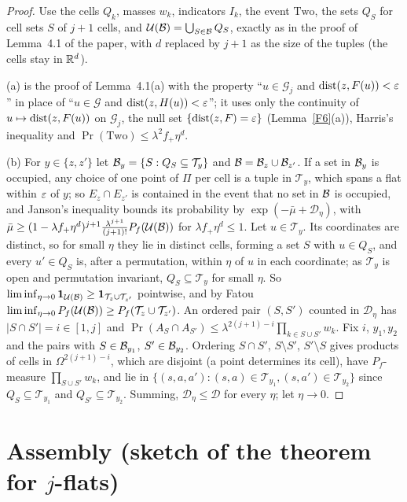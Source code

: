 \documentclass[11pt]{article}
\begin{document}
\begin{proof}
Use the cells $Q_k$, masses $w_k$, indicators $I_k$, the event $\mathrm{Two}$, the sets $Q_S$ for cell sets $S$ of $j+1$
cells, and $\mathcal U(\mathcal{B})=\bigcup_{S\in\mathcal{B}}Q_S$, exactly as in the proof of Lemma~4.1 of the paper, with $d$ replaced by $j+1$ as the
size of the tuples (the cells stay in $\mathbb{R}^d$).

(a) is the proof of Lemma~4.1(a) with the property ``$u\in\mathcal G_j$ and $\operatorname{dist}(z,F(u))<\varepsilon$'' in place of ``$u\in\mathcal G$ and
$\operatorname{dist}(z,H(u))<\varepsilon$''; it uses only the continuity of $u\mapsto\operatorname{dist}(z,F(u))$ on $\mathcal G_j$, the null set
$\{\operatorname{dist}(z,F)=\varepsilon\}$ (Lemma~\ref{F6}(a)), Harris's inequality and $\Pr(\mathrm{Two})\le\lambda^2f_+\eta^d$.

(b) For $y\in\{z,z'\}$ let $\mathcal{B}_y=\{S:Q_S\subseteq\mathcal T_y\}$ and $\mathcal{B}=\mathcal{B}_z\cup\mathcal{B}_{z'}$. If a set in $\mathcal{B}_y$ is occupied, any choice of
one point of $\Pi$ per cell is a tuple in $\mathcal T_y$, which spans a flat within $\varepsilon$ of $y$; so $E_z\cap E_{z'}$ is contained in
the event that no set in $\mathcal{B}$ is occupied, and Janson's inequality bounds its probability by $\exp(-\bar\mu+\mathcal D_\eta)$, with
$\bar\mu\ge(1-\lambda f_+\eta^d)^{j+1}\frac{\lambda^{j+1}}{(j+1)!}P_f(\mathcal U(\mathcal{B}))$ for $\lambda f_+\eta^d\le1$. Let $u\in\mathcal T_y$. Its coordinates are
distinct, so for small $\eta$ they lie in distinct cells, forming a set $S$ with $u\in Q_S$, and every $u'\in Q_S$ is, after a
permutation, within $\eta$ of $u$ in each coordinate; as $\mathcal T_y$ is open and permutation invariant, $Q_S\subseteq\mathcal T_y$ for
small $\eta$. So $\liminf_{\eta\to0}\mathbf{1}_{\mathcal U(\mathcal{B})}\ge\mathbf{1}_{\mathcal T_z\cup\mathcal T_{z'}}$ pointwise, and by Fatou
$\liminf_{\eta\to0}P_f(\mathcal U(\mathcal{B}))\ge P_f(\mathcal T_z\cup\mathcal T_{z'})$. An ordered pair $(S,S')$ counted in $\mathcal D_\eta$ has
$|S\cap S'|=i\in[1,j]$ and $\Pr(A_S\cap A_{S'})\le\lambda^{2(j+1)-i}\prod_{k\in S\cup S'}w_k$. Fix $i$, $y_1,y_2$ and the pairs with $S\in\mathcal{B}_{y_1}$,
$S'\in\mathcal{B}_{y_2}$. Ordering $S\cap S'$, $S\setminus S'$, $S'\setminus S$ gives products of cells in $\Omega^{2(j+1)-i}$, which are disjoint (a
point determines its cell), have $P_f$-measure $\prod_{S\cup S'}w_k$, and lie in $\{(s,a,a'):(s,a)\in\mathcal T_{y_1},(s,a')\in\mathcal T_{y_2}\}$
since $Q_S\subseteq\mathcal T_{y_1}$ and $Q_{S'}\subseteq\mathcal T_{y_2}$. Summing, $\mathcal D_\eta\le\mathcal D$ for every $\eta$; let $\eta\to0$.
\end{proof}

\section*{Assembly (sketch of the theorem for $j$-flats)}
\end{document}
